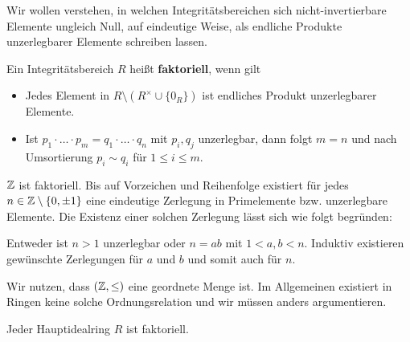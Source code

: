 \begin{leftbar}
	Wir wollen verstehen, in welchen Integritätsbereichen sich nicht-invertierbare Elemente ungleich Null, auf eindeutige Weise, als endliche Produkte unzerlegbarer Elemente schreiben lassen. 
\end{leftbar}
\begin{definition}
	Ein Integritätsbereich $R$ heißt \textbf{faktoriell}, wenn gilt
	\begin{itemize}
		\item Jedes Element in $R \setminus (R^\times \cup \{0_R\})$ ist endliches Produkt unzerlegbarer Elemente.
		\item Ist $p_1 \cdot \hdots \cdot p_m = q_1 \cdot \hdots \cdot q_n$ mit $p_i, q_j$ unzerlegbar, dann folgt $m = n$ und nach Umsortierung $p_i \sim q_i$ für $1 \leq i \leq m$.
	\end{itemize}
\end{definition}
\begin{beispiel}\label{beispiel6_12}
	$\mathbb{Z}$ ist faktoriell. Bis auf Vorzeichen und Reihenfolge existiert für jedes $n \in \mathbb{Z} \setminus \{0, \pm1\}$ eine eindeutige Zerlegung in Primelemente bzw. unzerlegbare Elemente. Die Existenz einer solchen Zerlegung lässt sich wie folgt begründen:
	
	Entweder ist $n > 1$ unzerlegbar oder $n = ab$ mit $1 < a,b < n$. Induktiv existieren gewünschte Zerlegungen für $a$ und $b$ und somit auch für $n$. 
	
	Wir nutzen, dass $(\mathbb{Z}, \leq)$ eine geordnete Menge ist. Im Allgemeinen existiert in Ringen keine solche Ordnungsrelation und wir müssen anders argumentieren.
\end{beispiel}
\begin{satz}\label{satz6_13}
	Jeder Hauptidealring $R$ ist faktoriell.
\end{satz}
